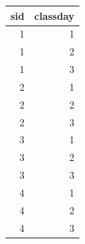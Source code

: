 \documentclass[
]{book}
\begin{document}
\begin{table}[!h]
\centering
\begin{tabular}{r|r}
\hline
sid & classday\\
\hline
\rowcolor{gray!6}  1 & 1\\
\hline
1 & 2\\
\hline
\rowcolor{gray!6}  1 & 3\\
\hline
2 & 1\\
\hline
\rowcolor{gray!6}  2 & 2\\
\hline
2 & 3\\
\hline
\rowcolor{gray!6}  3 & 1\\
\hline
3 & 2\\
\hline
\rowcolor{gray!6}  3 & 3\\
\hline
4 & 1\\
\hline
\rowcolor{gray!6}  4 & 2\\
\hline
4 & 3\\
\hline
\end{tabular}
\end{table}
\end{document}
